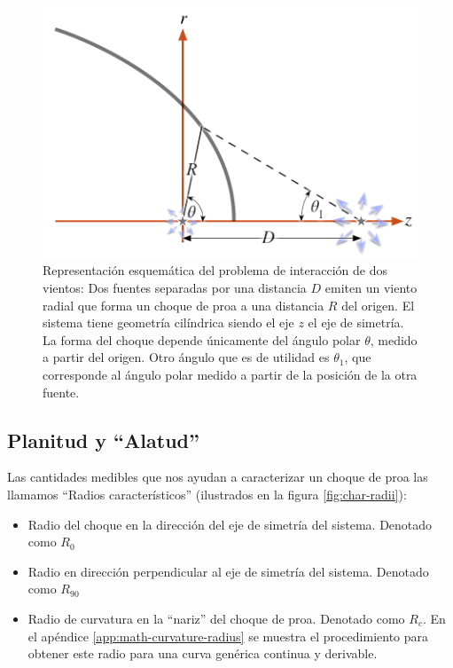 \begin{figure}
  \includegraphics[width=0.5\linewidth]{./Figures/bowshock-crw-variables}
  \caption{Representación esquemática del problema de interacción de dos vientos:
    Dos fuentes separadas por una distancia $D$ emiten un viento radial que forma un
    choque de proa a una distancia $R$ del origen. El sistema tiene geometría cilíndrica
    siendo el eje $z$ el eje de simetría. La forma del choque depende únicamente del ángulo
    polar $\theta$, medido a partir del origen. Otro ángulo que es de utilidad es $\theta_1$,
    que corresponde al ángulo polar medido a partir de la posición de la otra fuente.}
    \label{fig:crw-esquema}
\end{figure}

\subsection{Planitud y ``Alatud''}
\label{sec:char-rad}
Las cantidades medibles que nos ayudan a caracterizar un choque de proa las
llamamos ``Radios característicos'' (ilustrados en la figura
\ref{fig:char-radii}):
\begin{itemize}
\item Radio del choque en la dirección del eje de simetría del sistema.
  Denotado como $R_0$
\item Radio en dirección perpendicular al eje de simetría del sistema.
  Denotado como $R_{90}$
\item Radio de curvatura en la ``nariz'' del choque de proa. Denotado
  como $R_c$. En el apéndice \ref{app:math-curvature-radius} se muestra
  el procedimiento para obtener este radio para una curva genérica continua
  y derivable.
\end{itemize}

